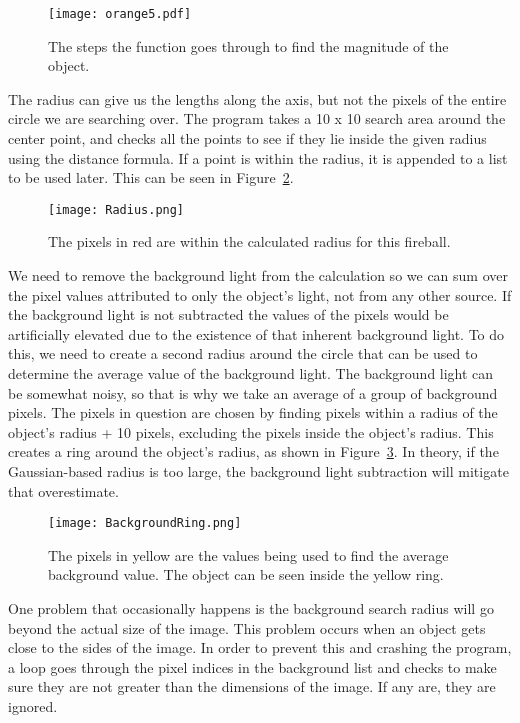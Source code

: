 \begin{figure}[htpb]
	\centering
	\texttt{[image: orange5.pdf]}
	\caption{The steps the function goes through to find the magnitude of the object.}
	\label{fig:magfinder}
\end{figure}

The radius can give us the lengths along the axis, but not the pixels of the entire circle we are searching over. The program takes a 10 x 10 search area around the center point, and checks all the points to see if they lie inside the given radius using the distance formula. If a point is within the radius, it is appended to a list to be used later. This can be seen in Figure~\ref{fig:radius}.

\begin{figure}[ht!]
	\centering
	\texttt{[image: Radius.png]}
	\caption{The pixels in red are within the calculated radius for this fireball.}
	\label{fig:radius}
\end{figure}

We need to remove the background light from the calculation so we can sum over the pixel values attributed to only the object's light, not from any other source. If the background light is not subtracted the values of the pixels would be artificially elevated due to the existence of that inherent background light. To do this, we need to create a second radius around the circle that can be used to determine the average value of the background light. The background light can be somewhat noisy, so that is why we take an average of a group of background pixels. The pixels in question are chosen by finding pixels within a radius of the object's radius + 10 pixels, excluding the pixels inside the object's radius. This creates a ring around the object's radius, as shown in Figure~\ref{fig:background}. In theory, if the Gaussian-based radius is too large, the background light subtraction will mitigate that overestimate.

\begin{figure}[ht!]
	\centering
	\texttt{[image: BackgroundRing.png]}
	\caption{The pixels in yellow are the values being used to find the average background value. The object can be seen inside the yellow ring.}
	\label{fig:background}
\end{figure}

One problem that occasionally happens is the background search radius will go beyond the actual size of the image. This problem occurs when an object gets close to the sides of the image. In order to prevent this and crashing the program, a loop goes through the pixel indices in the background list and checks to make sure they are not greater than the dimensions of the image. If any are, they are ignored. 

